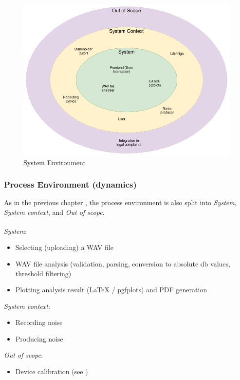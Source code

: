 \begin{figure}[H]
    \centering
    \includegraphics[width=1\textwidth]{../assets/system_environment.png}
    \caption{System Environment}\label{fig:system-environment}
\end{figure}

\subsubsection{Process Environment (dynamics)}\label{subsubsec:process_environment}
As in the previous chapter , the process environment is also split into \textit{System}, \textit{System context}, and \textit{Out of scope}. \\~\\
\textit{System}:
\begin{itemize}
    \item Selecting (uploading) a WAV file
    \item WAV file analysis (validation, parsing, conversion to absolute db values, threshold filtering)
    \item Plotting analysis result (LaTeX / pgfplots) and PDF generation
\end{itemize}
\textit{System context}:
\begin{itemize}
    \item Recording noise
    \item Producing noise
\end{itemize}
\textit{Out of scope}:
\begin{itemize}
    \item Device calibration (see )
\end{itemize}

